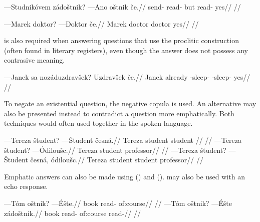 \pex
\begingl
\gla ---Studnik\'ovem z\'ado\v{s}tnik? ---Ano o\v{s}tnik \v{c}e.//
\glb send- read- but read- yes//
\glft {}//
\endgl
\xe

\pex
\begingl
\gla ---Marek doktor? ---Doktor \v{c}e.//
\glb Marek doctor doctor yes//
\glft {}//
\endgl
\xe

 is also required when answering questions that use the proclitic  construction (often found in literary registers), even though the answer does not possess any contrasive meaning.

\pex
\begingl
\gla ---Janek sa noz\'aduzdrav\v{s}ek? Uzdrav\v{s}ek \v{c}e.//
\glb Janek already -sleep- -sleep- yes//
\glft {}//
\endgl
\xe

To negate an existential question, the negative copula is used. An alternative may also be presented instead to contradict a question more emphatically. Both techniques would often used together in the spoken language.

\pex
\a
\begingl
\gla ---Tereza \v{s}tudent? ---\v{S}tudent \v{c}esn\'a.//
\glb Tereza student student //
\glft {}//
\endgl
\a
\begingl
\gla ---Tereza \v{s}tudent? ---\'Odilou\v{s}c.//
\glb Tereza student professor//
\glft {}//
\endgl
\a
\begingl
\gla ---Tereza \v{s}tudent? ---\v{S}tudent \v{c}esn\'a, \'odilou\v{s}c.//
\glb Tereza student student  professor//
\glft {}//
\endgl
\xe

Emphatic answers can also be made using  () and   ().  may also be used with an echo response.

\pex
\a
\begingl
\gla ---T\'om o\v{s}tnik? ---\'E\v{s}te.//
\glb book read- of:course//
\glft {}//
\endgl
\a
\begingl
\gla ---T\'om o\v{s}tnik? ---\'E\v{s}te z\'ado\v{s}tnik.//
\glb book read- of:course read-//
\glft {}//
\endgl
\xe

